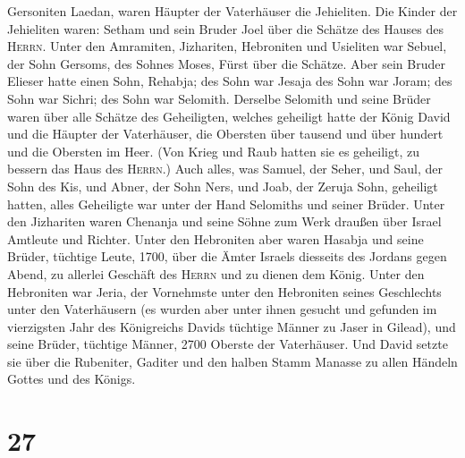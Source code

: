 Gersoniten Laedan, waren Häupter der Vaterhäuser die Jehieliten.
 Die Kinder der Jehieliten waren: Setham und sein Bruder
Joel über die Schätze des Hauses des \textsc{Herrn}. 
Unter den Amramiten, Jizhariten, Hebroniten und Usieliten
 war Sebuel, der Sohn Gersoms, des Sohnes Moses, Fürst
über die Schätze.  Aber sein Bruder Elieser hatte einen
Sohn, Rehabja; des Sohn war Jesaja des Sohn war Joram; des Sohn war
Sichri; des Sohn war Selomith.  Derselbe Selomith und
seine Brüder waren über alle Schätze des Geheiligten, welches geheiligt
hatte der König David und die Häupter der Vaterhäuser, die Obersten über
tausend und über hundert und die Obersten im Heer.  (Von
Krieg und Raub hatten sie es geheiligt, zu bessern das Haus des
\textsc{Herrn}.)  Auch alles, was Samuel, der Seher, und
Saul, der Sohn des Kis, und Abner, der Sohn Ners, und Joab, der Zeruja
Sohn, geheiligt hatten, alles Geheiligte war unter der Hand Selomiths
und seiner Brüder.  Unter den Jizhariten waren Chenanja
und seine Söhne zum Werk draußen über Israel Amtleute und Richter.
 Unter den Hebroniten aber waren Hasabja und seine
Brüder, tüchtige Leute, 1700, über die Ämter Israels diesseits des
Jordans gegen Abend, zu allerlei Geschäft des \textsc{Herrn} und zu
dienen dem König.  Unter den Hebroniten war Jeria, der
Vornehmste unter den Hebroniten seines Geschlechts unter den
Vaterhäusern (es wurden aber unter ihnen gesucht und gefunden im
vierzigsten Jahr des Königreichs Davids tüchtige Männer zu Jaser in
Gilead),  und seine Brüder, tüchtige Männer, 2700 Oberste
der Vaterhäuser. Und David setzte sie über die Rubeniter, Gaditer und
den halben Stamm Manasse zu allen Händeln Gottes und des Königs.

\hypertarget{section-26}{%
\section{27}\label{section-26}}

